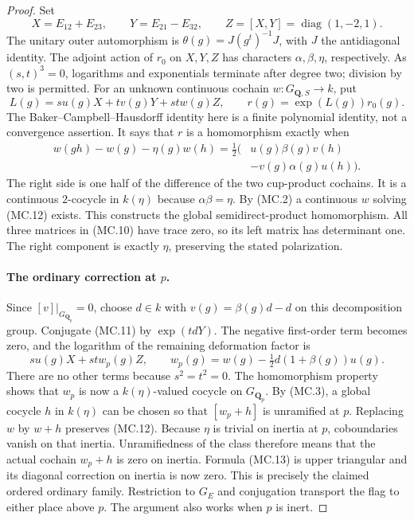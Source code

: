 \begin{proof}
Set
\[
 X=E_{12}+E_{23},\qquad Y=E_{21}-E_{32},\qquad
 Z=[X,Y]=\operatorname{diag}(1,-2,1).                     \tag{MC.10}
\]
The unitary outer automorphism is
$\theta(g)=J(g^t)^{-1}J$, with $J$ the antidiagonal identity.
The adjoint action of $r_0$ on $X,Y,Z$ has characters
$\alpha,\beta,\eta$, respectively.
As $(s,t)^3=0$, logarithms and exponentials terminate after
degree two; division by two is permitted.
For an unknown continuous cochain $w:G_{\mathbf Q,S}\to k$,
put
\[
 L(g)=s u(g)X+t v(g)Y+st w(g)Z,
 \qquad r(g)=\exp(L(g))r_0(g).                            \tag{MC.11}
\]
The Baker--Campbell--Hausdorff identity here is a finite
polynomial identity, not a convergence assertion.
It says that $r$ is a homomorphism exactly when
\[
 \begin{split}
 w(gh)-w(g)-\eta(g)w(h)
   =\tfrac12\bigl(&u(g)\beta(g)v(h)\\
                 &-v(g)\alpha(g)u(h)\bigr).
 \end{split}                                             \tag{MC.12}
\]
The right side is one half of the difference of the two
cup-product cochains.  It is a continuous $2$-cocycle in
$k(\eta)$ because $\alpha\beta=\eta$.
By (MC.2) a continuous $w$ solving (MC.12) exists.
This constructs the global semidirect-product homomorphism.
All three matrices in (MC.10) have trace zero, so its left
matrix has determinant one.  The right component is exactly
$\eta$, preserving the stated polarization.

\paragraph{The ordinary correction at $p$.}
Since $[v]|_{G_{\mathbf Q_p}}=0$, choose $d\in k$ with
$v(g)=\beta(g)d-d$ on this decomposition group.
Conjugate (MC.11) by $\exp(tdY)$.
The negative first-order term becomes zero, and the logarithm
of the remaining deformation factor is
\[
       s u(g)X+st w_p(g)Z,\qquad
       w_p(g)=w(g)-\tfrac12d(1+\beta(g))u(g).             \tag{MC.13}
\]
There are no other terms because $s^2=t^2=0$.
The homomorphism property shows that $w_p$ is now a
$k(\eta)$-valued cocycle on $G_{\mathbf Q_p}$.
By (MC.3), a global cocycle $h$ in $k(\eta)$ can be chosen
so that $[w_p+h]$ is unramified at $p$.
Replacing $w$ by $w+h$ preserves (MC.12).
Because $\eta$ is trivial on inertia at $p$, coboundaries
vanish on that inertia.  Unramifiedness of the class therefore
means that the actual cochain $w_p+h$ is zero on inertia.
Formula (MC.13) is upper triangular and its diagonal
correction on inertia is now zero.  This is precisely the
claimed ordered ordinary family.  Restriction to $G_E$
and conjugation transport the flag to either place above $p$.
The argument also works when $p$ is inert.


\end{proof}

